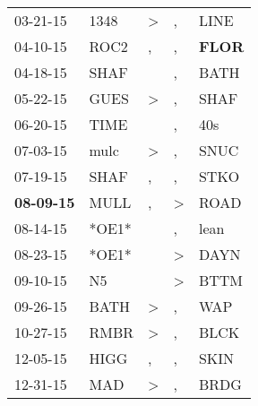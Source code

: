 \begin{supertabular}{p{0.07\textwidth}p{0.06\textwidth}p{0.02\textwidth}p{0.02\textwidth}p{0.06\textwidth}}
          03-21-15\textsuperscript{} &           1348\textsuperscript{} &     \textgreater &             , &           LINE\textsuperscript{} \\
          04-10-15\textsuperscript{} &           ROC2\textsuperscript{} &                , &             , &  \textbf{FLOR\textsuperscript{}} \\
          04-18-15\textsuperscript{} &           SHAF\textsuperscript{} &                  &             , &           BATH\textsuperscript{} \\
          05-22-15\textsuperscript{} &           GUES\textsuperscript{} &     \textgreater &             , &           SHAF\textsuperscript{} \\
          06-20-15\textsuperscript{} &           TIME\textsuperscript{} &                  &             , &            40s\textsuperscript{} \\
          07-03-15\textsuperscript{} &           mulc\textsuperscript{} &     \textgreater &             , &           SNUC\textsuperscript{} \\
          07-19-15\textsuperscript{} &           SHAF\textsuperscript{} &                , &             , &           STKO\textsuperscript{} \\
 \textbf{08-09-15\textsuperscript{}} &           MULL\textsuperscript{} &                , &  \textgreater &           ROAD\textsuperscript{} \\
          08-14-15\textsuperscript{} &                            *OE1* &                  &             , &           lean\textsuperscript{} \\
          08-23-15\textsuperscript{} &                            *OE1* &                  &  \textgreater &           DAYN\textsuperscript{} \\
          09-10-15\textsuperscript{} &             N5\textsuperscript{} &                  &  \textgreater &           BTTM\textsuperscript{} \\
          09-26-15\textsuperscript{} &           BATH\textsuperscript{} &     \textgreater &             , &            WAP\textsuperscript{} \\
          10-27-15\textsuperscript{} &           RMBR\textsuperscript{} &     \textgreater &             , &           BLCK\textsuperscript{} \\
          12-05-15\textsuperscript{} &           HIGG\textsuperscript{} &                , &             , &           SKIN\textsuperscript{} \\
          12-31-15\textsuperscript{} &            MAD\textsuperscript{} &     \textgreater &             , &           BRDG\textsuperscript{} \\

\end{supertabular}
